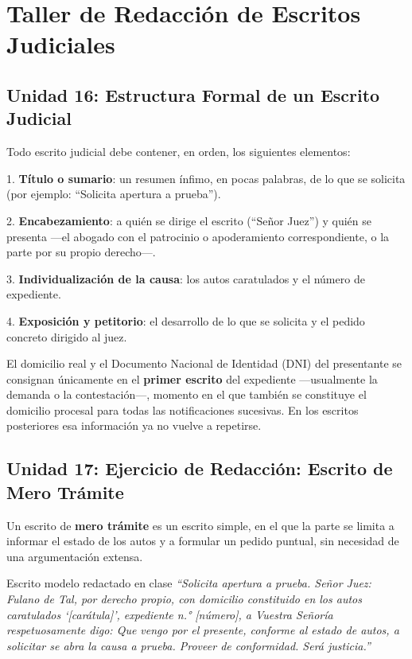 \documentclass[12pt,oneside]{book}
\begin{document}
\chapter{Taller de Redacción de Escritos Judiciales}

\section{Unidad 16: Estructura Formal de un Escrito Judicial}

Todo escrito judicial debe contener, en orden, los siguientes elementos:

\begin{important}
1. \textbf{Título o sumario}: un resumen ínfimo, en pocas palabras, de lo que se solicita (por ejemplo: ``Solicita apertura a prueba'').

2. \textbf{Encabezamiento}: a quién se dirige el escrito (``Señor Juez'') y quién se presenta ---el abogado con el patrocinio o apoderamiento correspondiente, o la parte por su propio derecho---.

3. \textbf{Individualización de la causa}: los autos caratulados y el número de expediente.

4. \textbf{Exposición y petitorio}: el desarrollo de lo que se solicita y el pedido concreto dirigido al juez.
\end{important}

El domicilio real y el Documento Nacional de Identidad (DNI) del presentante se consignan únicamente en el \textbf{primer escrito} del expediente ---usualmente la demanda o la contestación---, momento en el que también se constituye el domicilio procesal para todas las notificaciones sucesivas. En los escritos posteriores esa información ya no vuelve a repetirse.

\section{Unidad 17: Ejercicio de Redacción: Escrito de Mero Trámite}

Un escrito de \textbf{mero trámite} es un escrito simple, en el que la parte se limita a informar el estado de los autos y a formular un pedido puntual, sin necesidad de una argumentación extensa.

\begin{example}{Escrito modelo redactado en clase}
\textit{``Solicita apertura a prueba. Señor Juez: Fulano de Tal, por derecho propio, con domicilio constituido en los autos caratulados `[carátula]', expediente n.° [número], a Vuestra Señoría respetuosamente digo: Que vengo por el presente, conforme al estado de autos, a solicitar se abra la causa a prueba. Proveer de conformidad. Será justicia.''}
\end{example}
\end{document}
